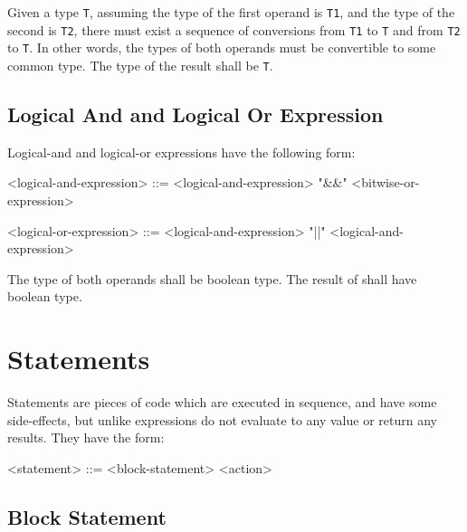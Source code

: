 Given a type \texttt{T}, assuming the type of the first operand is \texttt{T1}, and the type of the second is \texttt{T2}, there must exist a sequence of conversions from \texttt{T1} to \texttt{T} and from \texttt{T2} to \texttt{T}. In other words, the types of both operands must be convertible to some common type. The type of the result shall be \texttt{T}.

\subsection{Logical And and Logical Or Expression} \label{guide:logical_expr}

Logical-and and logical-or expressions have the following form:

\begin{minip}
\begin{grammar}
<logical-and-expression> ::= <logical-and-expression> "\&\&" <bitwise-or-expression>

<logical-or-expression> ::= <logical-and-expression> "||" <logical-and-expression>
\end{grammar}
\end{minip}

The type of both operands shall be boolean type. The result of shall have boolean type.

\section{Statements} \label{guide:statements}

Statements are pieces of code which are executed in sequence, and have some side-effects, but unlike expressions do not evaluate to any value or return any results. They have the form:

\begin{minip}
\begin{grammar}
<statement> ::=
     <block-statement>
\alt <action>
\end{grammar}
\end{minip}

\subsection{Block Statement} \label{guide:block_stmt}

